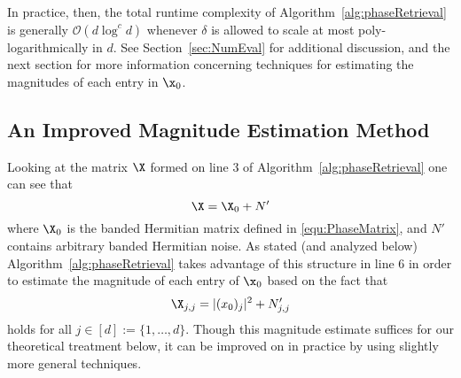 In practice, then, the total runtime complexity of Algorithm~\ref{alg:phaseRetrieval} is generally $\mathcal{O}(d \log^c d)$ whenever $\delta$ is allowed to scale at most poly-logarithmically in $d$.  See Section~\ref{sec:NumEval} for additional discussion, and the next section for more information concerning techniques for estimating the magnitudes of each entry in $\x_0$.

\subsection{An Improved Magnitude Estimation Method}

Looking at the matrix $\X$ formed on line 3 of Algorithm~\ref{alg:phaseRetrieval} one can see that
$$\X= \X_0 + N'$$
where $\X_0$ is the banded Hermitian matrix defined in \eqref{equ:PhaseMatrix}, and $N'$ contains arbitrary banded Hermitian noise.  As stated (and analyzed below) Algorithm~\ref{alg:phaseRetrieval} takes advantage of this structure in line 6 in order to estimate the magnitude of each entry of $\x_0$ based on the fact that 
$$\X_{j,j} = |(x_0)_{j}|^2 + N'_{j,j}$$
holds for all $j \in [d] := \{ 1, \dots, d\}$.  Though this magnitude estimate suffices for our theoretical treatment below, it can be improved on in practice by using slightly more general techniques.

